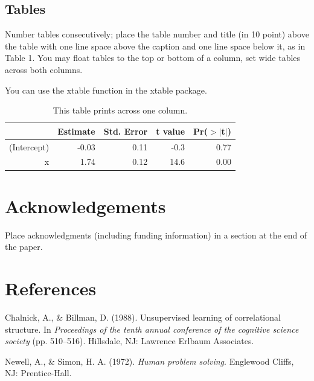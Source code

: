 \documentclass[10pt, letterpaper]{article}
\newenvironment{CSLReferences}%
  {}%
  {\par}
\begin{document}
\hypertarget{tables}{%
\subsection{Tables}\label{tables}}

Number tables consecutively; place the table number and title (in 10
point) above the table with one line space above the caption and one
line space below it, as in Table 1. You may float tables to the top or
bottom of a column, set wide tables across both columns.

You can use the xtable function in the xtable package.

\begin{table}[H]
\centering
\begin{tabular}{rrrrr}
  \hline
 & Estimate & Std. Error & t value & Pr($>$$|$t$|$) \\ 
  \hline
(Intercept) & -0.03 & 0.11 & -0.3 & 0.77 \\ 
  x & 1.74 & 0.12 & 14.6 & 0.00 \\ 
   \hline
\end{tabular}
\caption{This table prints across one column.} 
\end{table}

\hypertarget{acknowledgements}{%
\section{Acknowledgements}\label{acknowledgements}}

Place acknowledgments (including funding information) in a section at
the end of the paper.

\hypertarget{references}{%
\section{References}\label{references}}

\setlength{\parindent}{-0.1in} 
\setlength{\leftskip}{0.125in}

\noindent

\hypertarget{refs}{}
\begin{CSLReferences}{1}{0}
\leavevmode{}%
Chalnick, A., \& Billman, D. (1988). Unsupervised learning of
correlational structure. In \emph{Proceedings of the tenth annual
conference of the cognitive science society} (pp. 510--516). Hillsdale,
NJ: Lawrence Erlbaum Associates.

\leavevmode{}%
Newell, A., \& Simon, H. A. (1972). \emph{Human problem solving}.
Englewood Cliffs, NJ: Prentice-Hall.

\end{CSLReferences}


\end{document}
